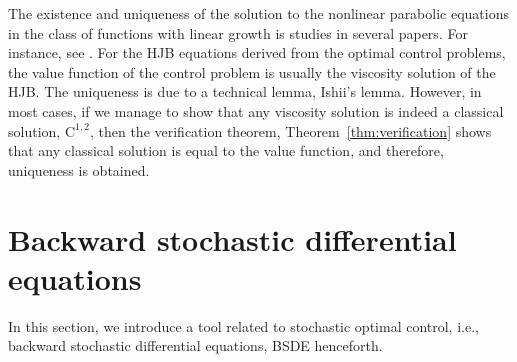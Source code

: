 \documentclass[11pt]{book}
\begin{document}
The existence and uniqueness of the solution to the nonlinear parabolic equations in the class of functions with linear growth is studies in several papers. For instance, see \cite{CIL92}. For the HJB equations derived from the optimal control problems, the value function of the control problem is usually the viscosity solution of the HJB. The uniqueness is due to a technical lemma, Ishii's lemma. However, in most cases, if we manage to show that any viscosity solution is indeed a classical solution, $\mathrm{C}^{1,2}$, then the verification theorem, Theorem~\ref{thm:verification} shows that any classical solution is equal to the value function, and therefore, uniqueness is obtained.

\section{Backward stochastic differential equations}
In this section, we introduce a tool related to stochastic optimal control, i.e., backward stochastic differential equations, BSDE henceforth. 
\end{document}
